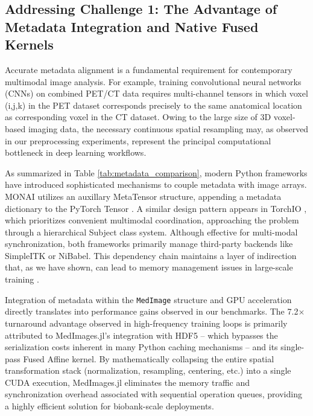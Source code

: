 \documentclass[a4paper,10pt,preprint]{elsarticle}
\begin{document}
\subsection*{Addressing Challenge 1: The Advantage of Metadata Integration and Native Fused Kernels}

Accurate metadata alignment is a fundamental requirement for contemporary multimodal image analysis. For example, training convolutional neural networks (CNNs) on combined PET/CT data requires multi-channel tensors in which voxel (i,j,k) in the PET dataset corresponds precisely to the same anatomical location as corresponding voxel in the CT dataset. Owing to the large size of 3D voxel-based imaging data, the necessary continuous spatial resampling may, as observed in our preprocessing experiments, represent the principal computational bottleneck in deep learning workflows. 

As summarized in Table \ref{tab:metadata_comparison}, modern Python frameworks have introduced sophisticated mechanisms to couple metadata with image arrays. MONAI utilizes an auxillary MetaTensor structure, appending a metadata dictionary to the PyTorch Tensor \cite{CardosoLi2022}. A similar design pattern appears in TorchIO \cite{perezgarcia2021torchio}, which prioritizes convenient multimodal coordination, approaching the problem through a hierarchical Subject class system. Although effective for multi-modal synchronization, both frameworks primarily manage third-party backends like SimpleITK or NiBabel. This dependency chain maintains a layer of indirection that, as we have shown, can lead to memory management issues in large-scale training \cite{perezgarcia2021torchio}.

Integration of metadata within the \texttt{MedImage} structure and GPU acceleration directly translates into performance gains observed in our benchmarks. The 7.2$\times$ turnaround advantage observed in high-frequency training loops is primarily attributed to MedImages.jl's integration with HDF5 -- which bypasses the serialization costs inherent in many Python caching mechanisms -- and its single-pass Fused Affine kernel. By mathematically collapsing the entire spatial transformation stack (normalization, resampling, centering, etc.) into a single CUDA execution, MedImages.jl eliminates the memory traffic and synchronization overhead associated with sequential operation queues, providing a highly efficient solution for biobank-scale deployments.
\end{document}
